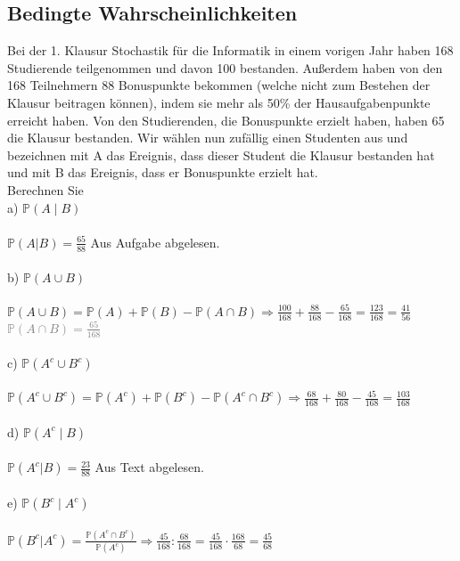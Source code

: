 \documentclass[a4paper]{article}
\begin{document}
\subsection{Bedingte Wahrscheinlichkeiten}
Bei der 1. Klausur Stochastik für die Informatik in einem vorigen Jahr haben 168 Studierende
teilgenommen und davon 100 bestanden. Außerdem haben von den 168 Teilnehmern 88 Bonuspunkte bekommen (welche nicht zum Bestehen der Klausur beitragen können), indem sie mehr als 50\% der Hausaufgabenpunkte erreicht haben. Von den Studierenden, die Bonuspunkte erzielt haben, haben 65 die Klausur bestanden. Wir wählen nun zufällig einen Studenten aus und bezeichnen mit A das Ereignis, dass dieser Student die Klausur bestanden hat und mit B das Ereignis, dass er Bonuspunkte erzielt hat.\\
Berechnen Sie\\
a) $\mathbb{P}(A \mid B)$\\\\
\(\mathbb{P}(A\vert B) = \frac{65}{88}\) Aus Aufgabe abgelesen.\\\\
b) $\mathbb{P}(A \cup B)$\\\\
\(\mathbb{P}(A \cup B) = \mathbb{P}(A) + \mathbb{P}(B)- \mathbb{P}(A \cap B) \Rightarrow \frac{100}{168}+\frac{88}{168}-\frac{65}{168}=\frac{123}{168}=\frac{41}{56}\)\\
\textcolor{gray}{$\mathbb{P}(A \cap B) = \frac{65}{168}$}\\\\
c) $\mathbb{P}(A^c \cup B^c)$\\\\
\(\mathbb{P}(A^c \cup B^c)= \mathbb{P}(A^c)+ \mathbb{P}(B^c)- \mathbb{P}(A^c \cap B^c) \Rightarrow \frac{68}{168}+ \frac{80}{168}-\frac{45}{168}=\frac{103}{168}\)\\\\
d) $\mathbb{P}(A^c \mid B)$\\\\
\(\mathbb{P}(A^c\vert B) = \frac{23}{88}\) Aus Text abgelesen.\\\\
e) $\mathbb{P}(B^c \mid A^c)$\\\\
\(\mathbb{P}(B^c\vert A^c)=\frac{\mathbb{P}(A^c \cap B^c)}{\mathbb{P}(A^c)}\Rightarrow \frac{45}{168}:\frac{68}{168}= \frac{45}{168}\cdot \frac{168}{68}=\frac{45}{68}\)
\end{document}

